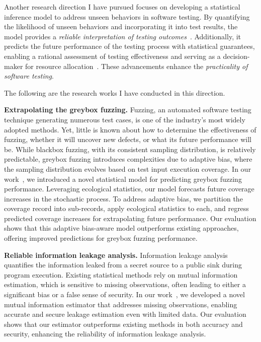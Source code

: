 \documentclass{article}
\begin{document}
Another research direction I have pursued focuses on developing a statistical inference model to address unseen behaviors in software testing. By quantifying the likelihood of unseen behaviors and incorporating it into test results, the model provides a \emph{reliable interpretation of testing outcomes}~\cite{leeStatisticalReachabilityAnalysis2023,leeAccountingMissingEvents2025}. Additionally, it predicts the future performance of the testing process with statistical guarantees, enabling a rational assessment of testing effectiveness and serving as a decision-maker for resource allocation~\cite{liyanageExtrapolatingCoverageRate2024,leeStructureawareResidualRisk2025}. These advancements enhance the \emph{practicality of software testing}.


\vspace{0.5em} \noindent
The following are the research works I have conducted in this direction.

\vspace{0.5em}
\noindent\textbf{Extrapolating the greybox fuzzing.}
Fuzzing, an automated software testing technique generating numerous test cases, is one of the industry's most widely adopted methods. Yet, little is known about how to determine the effectiveness of fuzzing, whether it will uncover new defects, or what its future performance will be. While blackbox fuzzing, with its consistent sampling distribution, is relatively predictable, greybox fuzzing introduces complexities due to adaptive bias, where the sampling distribution evolves based on test input execution coverage. In our work~\cite{liyanageExtrapolatingCoverageRate2024}, we introduced a novel statistical model for predicting greybox fuzzing performance. Leveraging ecological statistics, our model forecasts future coverage increases in the stochastic process. To address adaptive bias, we partition the coverage record into sub-records, apply ecological statistics to each, and regress predicted coverage increases for extrapolating future performance. Our evaluation shows that this adaptive bias-aware model outperforms existing approaches, offering improved predictions for greybox fuzzing performance.

\vspace{0.5em}
\noindent\textbf{Reliable information leakage analysis.} Information leakage analysis quantifies the information leaked from a secret source to a public sink during program execution. Existing statistical methods rely on mutual information estimation, which is sensitive to missing observations, often leading to either a significant bias or a false sense of security. In our work~\cite{leeAccountingMissingEvents2025}, we developed a novel mutual information estimator that addresses missing observations, enabling accurate and secure leakage estimation even with limited data. Our evaluation shows that our estimator outperforms existing methods in both accuracy and security, enhancing the reliability of information leakage analysis.
\end{document}
